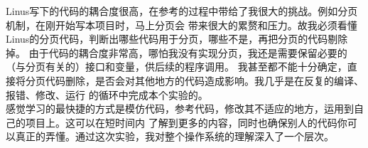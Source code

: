 \documentclass[a4paper]{article}
\begin{document}
    Linus写下的代码的耦合度很高，在参考的过程中带给了我很大的挑战。例如分页机制，在刚开始写本项目时，马上分页会
    带来很大的累赘和压力。故我必须看懂Linus的分页代码，判断出哪些代码用于分页，哪些不是，再把分页的代码剔除掉。
    由于代码的耦合度非常高，哪怕我没有实现分页，我还是需要保留必要的（与分页有关的）接口和变量，供后续的程序调用。
    我甚至都不能十分确定，直接将分页代码删除，是否会对其他地方的代码造成影响。我几乎是在反复的编译、报错、修改、运行
    的循环中完成本个实验的。\\ 

    感觉学习的最快捷的方式是模仿代码，参考代码，修改其不适应的地方，运用到自己的项目上。这可以在短时间内
    了解到更多的内容，同时也确保别人的代码你可以真正的弄懂。通过这次实验，我对整个操作系统的理解深入了一个层次。
\end{document}
